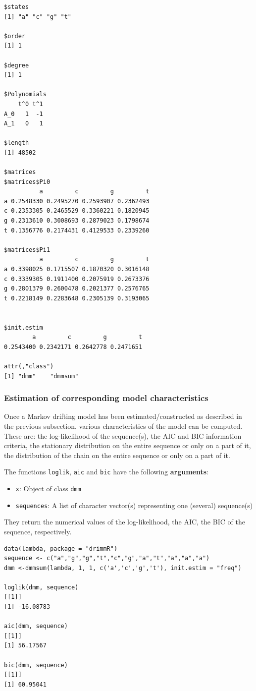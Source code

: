\documentclass[article,nojss]{jss}\usepackage[]{graphicx}\usepackage[]{color}
\begin{document}
\begin{lstlisting}
$states
[1] "a" "c" "g" "t"

$order
[1] 1

$degree
[1] 1

$Polynomials
    t^0 t^1
A_0   1  -1
A_1   0   1

$length
[1] 48502

$matrices
$matrices$Pi0
          a         c         g         t
a 0.2548330 0.2495270 0.2593907 0.2362493
c 0.2353305 0.2465529 0.3360221 0.1820945
g 0.2313610 0.3008693 0.2879023 0.1798674
t 0.1356776 0.2174431 0.4129533 0.2339260

$matrices$Pi1
          a         c         g         t
a 0.3398025 0.1715507 0.1870320 0.3016148
c 0.3339305 0.1911400 0.2075919 0.2673376
g 0.2801379 0.2600478 0.2021377 0.2576765
t 0.2218149 0.2283648 0.2305139 0.3193065


$init.estim
        a         c         g         t
0.2543400 0.2342171 0.2642778 0.2471651

attr(,"class")
[1] "dmm"    "dmmsum"
\end{lstlisting}

\clearpage

\subsubsection{Estimation of corresponding model characteristics} \label{subsection_pack_charact}

Once a Markov drifting model has been estimated/constructed as described in the previous subsection, various characteristics of the model can be computed. These are: the log-likelihood of the sequence(s), the AIC and BIC information criteria, the stationary distribution on the entire sequence or only on a part of it, the distribution of the chain on the entire sequence or only on a part of it.

The functions {\tt loglik}, {\tt aic} and {\tt bic}  have the following {\bf arguments}:
%
\begin{itemize}
\item {\tt x}: Object of class {\tt dmm}
\item {\tt sequences}:  A list of character vector(s) representing one (several) sequence(s)
\end{itemize}
%
They return the numerical values of the log-likelihood, the AIC, the BIC of the sequence, respectively.

\begin{lstlisting}
data(lambda, package = "drimmR")
sequence <- c("a","g","g","t","c","g","a","t","a","a","a")
dmm <-dmmsum(lambda, 1, 1, c('a','c','g','t'), init.estim = "freq")

loglik(dmm, sequence)
[[1]]
[1] -16.08783

aic(dmm, sequence)
[[1]]
[1] 56.17567

bic(dmm, sequence)
[[1]]
[1] 60.95041
\end{lstlisting}
\end{document}
